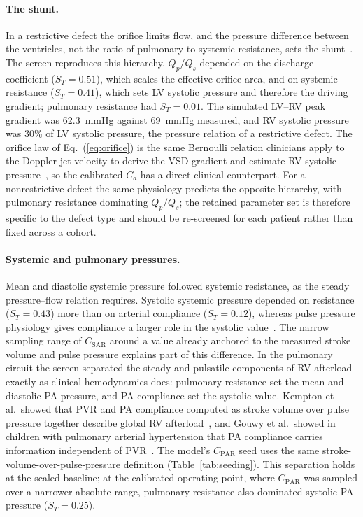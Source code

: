 \documentclass{article}
\begin{document}
\paragraph{The shunt.} In a restrictive defect the orifice limits flow, and the pressure difference between the ventricles, not the ratio of pulmonary to systemic resistance, sets the shunt~\cite{Rao2024,Haas_2024}. The screen reproduces this hierarchy. $Q_p/Q_s$ depended on the discharge coefficient ($S_T = 0.51$), which scales the effective orifice area, and on systemic resistance ($S_T = 0.41$), which sets LV systolic pressure and therefore the driving gradient; pulmonary resistance had $S_T = 0.01$. The simulated LV--RV peak gradient was 62.3~mmHg against 69~mmHg measured, and RV systolic pressure was 30\% of LV systolic pressure, the pressure relation of a restrictive defect. The orifice law of Eq.~(\ref{eq:orifice}) is the same Bernoulli relation clinicians apply to the Doppler jet velocity to derive the VSD gradient and estimate RV systolic pressure~\cite{Uppu2022}, so the calibrated $C_d$ has a direct clinical counterpart. For a nonrestrictive defect the same physiology predicts the opposite hierarchy, with pulmonary resistance dominating $Q_p/Q_s$; the retained parameter set is therefore specific to the defect type and should be re-screened for each patient rather than fixed across a cohort.

\paragraph{Systemic and pulmonary pressures.} Mean and diastolic systemic pressure followed systemic resistance, as the steady pressure--flow relation requires. Systolic systemic pressure depended on resistance ($S_T = 0.43$) more than on arterial compliance ($S_T = 0.12$), whereas pulse pressure physiology gives compliance a larger role in the systolic value~\cite{FloresGeronimo2021}. The narrow sampling range of $C_{\mathrm{SAR}}$ around a value already anchored to the measured stroke volume and pulse pressure explains part of this difference. In the pulmonary circuit the screen separated the steady and pulsatile components of RV afterload exactly as clinical hemodynamics does: pulmonary resistance set the mean and diastolic PA pressure, and PA compliance set the systolic value. Kempton et al.\ showed that PVR and PA compliance computed as stroke volume over pulse pressure together describe global RV afterload~\cite{Kempton2025}, and Gouwy et al.\ showed in children with pulmonary arterial hypertension that PA compliance carries information independent of PVR~\cite{Gouwy2025}. The model's $C_{\mathrm{PAR}}$ seed uses the same stroke-volume-over-pulse-pressure definition (Table~\ref{tab:seeding}). This separation holds at the scaled baseline; at the calibrated operating point, where $C_{\mathrm{PAR}}$ was sampled over a narrower absolute range, pulmonary resistance also dominated systolic PA pressure ($S_T = 0.25$).
\end{document}
